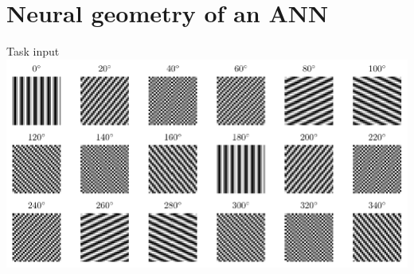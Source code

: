 \documentclass[aspectratio=169]{beamer}
\begin{document}
\section{Neural geometry of an ANN}

\begin{frame}{Task input}
    \includegraphics[width=\textwidth]{results/grating_samples.pdf}
\end{frame}
\end{document}
